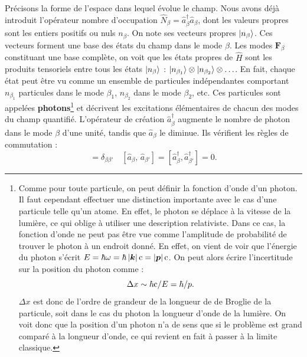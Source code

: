 Précisons la forme de l'espace dans lequel évolue le champ. Nous avons déjà introduit l'opérateur nombre d'occupation $\hat{N}_{\beta}=\hat{a}^{\dag}_{\beta}\hat{a}_{\beta}$, dont les valeurs propres sont les entiers positifs ou nuls $n_{\beta}$. On note ses vecteurs propres $\ket{n_{\beta}}$. Ces vecteurs forment une base des états du champ dans le mode ${\beta}$. Les modes $\bm{F}_{\beta}$ constituant une base complète, on voit que les états propres de $\hat{H}$ sont les produits tensoriels entre tous les états $\ket{n_{\beta}}$ : $\ket{n_{\beta_1}}\otimes\ket{n_{\beta_2}}\otimes\ldots$. En fait, chaque état peut être vu comme un ensemble de particules indépendantes comportant $n_{\beta_1}$ particules dans le mode ${\beta_1}$, $n_{\beta_2}$ dans le mode ${\beta_2}$, etc. Ces particules sont appelées \textbf{photons}\footnote{Comme pour toute particule, on peut définir la fonction d'onde d'un photon. Il faut cependant effectuer une distinction importante avec le cas d'une particule telle qu'un atome. En effet, le photon se déplace à la vitesse de la lumière, ce qui oblige à utiliser une description relativiste. Dans ce cas, la fonction d'onde ne peut pas être vue comme l'amplitude de probabilité de trouver le photon à un endroit donné. En effet, on vient de voir que l'énergie du photon s'écrit $E = \hbar\omega = \hbar\left|\bm{k}\right|\mathrm{c}=\left|\bm{p}\right|\mathrm{c}$. On peut alors écrire l'incertitude sur la position du photon comme :
\begin{equation}
\Delta x \sim \hbar\mathrm{c}/E = \hbar/p.
\end{equation}
$\Delta x$ est donc de l'ordre de grandeur de la longueur de de Broglie de la particule, soit dans le cas du photon la longueur d'onde de la lumière. On voit donc que la position d'un photon n'a de sens que si le problème est grand comparé à la longueur d'onde, ce qui revient en fait à passer à la limite classique.} et décrivent les excitations élémentaires de chacun des modes du champ quantifié. L'opérateur de création $\hat{a}^{\dag}_{\beta}$ augmente le nombre de photon dans le mode ${\beta}$ d'une unité, tandis que $\hat{a}_{\beta}$ le diminue. Ils vérifient les règles de commutation  :
\begin{equation}
[\hat{a}_{\beta},\,\hat{a}^{\dag}_{\beta'}] = \delta_{\beta\beta'} \quad [\hat{a}_{\beta},\,\hat{a}_{\beta'}]=[\hat{a}^{\dag}_{\beta},\hat{a}^{\dag}_{\beta'}]=0.
\label{eq:commut_a}
\end{equation}

